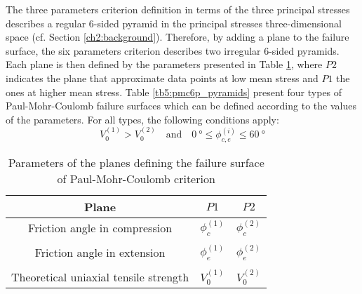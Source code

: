The three parameters criterion definition in terms of the three principal stresses describes a regular 6-sided pyramid in the principal stresses three-dimensional space (cf. Section \ref{ch2:background}). Therefore, by adding a plane to the failure surface, the six parameters criterion describes two irregular 6-sided pyramids. Each plane is then defined by the parameters presented in Table \ref{tb5:pmc6p_planeparam}, where $P2$ indicates the plane that approximate data points at low mean stress and $P1$ the ones at higher mean stress. Table \ref{tb5:pmc6p_pyramids} present four types of Paul-Mohr-Coulomb failure surfaces which can be defined according to the values of the parameters. For all types, the following conditions apply: 
\begin{equation}
    V_0^{(1)} > V_0^{(2)} \quad \textrm{and} \quad \SI{0}{\degree} \leq \phi_{c,e}^{(i)} \leq \SI{60}{\degree}
\end{equation}

\begin{table}
    \centering 
    \begin{tabular}{ccc}
        \hline 
        Plane & $P1$ & $P2$  \\
        \hline
        \hline
        Friction angle in compression & $\phi_{c}^{(1)}$ & $\phi_{c}^{(2)}$ \\
        \\
        Friction angle in extension & $\phi_{e}^{(1)}$ & $\phi_{e}^{(2)}$ \\ 
        \\
        Theoretical uniaxial tensile strength & $V_0^{(1)}$ & $V_0^{(2)}$ \\
        \hline
    \end{tabular}
    \captionsetup{justification=centering}
    \caption{Parameters of the planes defining the failure surface of Paul-Mohr-Coulomb criterion}
    \label{tb5:pmc6p_planeparam}
\end{table}

